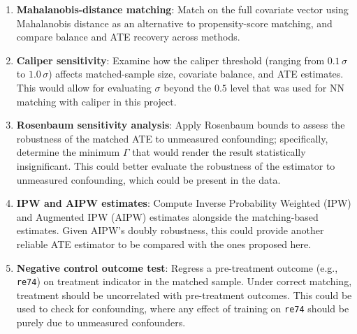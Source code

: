 \documentclass[12pt, a4paper]{article}
\begin{document}
\begin{enumerate}[leftmargin=2em]
  \item \textbf{Mahalanobis-distance matching}: Match on the full covariate vector using Mahalanobis distance as an alternative to propensity-score matching, and compare balance and ATE recovery across methods.
  \item \textbf{Caliper sensitivity}: Examine how the caliper threshold (ranging from $0.1\,\sigma$ to $1.0\,\sigma$) affects matched-sample size, covariate balance, and ATE estimates. This would allow for evaluating $\sigma$ beyond the $0.5$ level that was used for NN matching with caliper in this project.
  \item \textbf{Rosenbaum sensitivity analysis}: Apply Rosenbaum bounds \citep{rosenbaum2002observational} to assess the robustness of the matched ATE to unmeasured confounding; specifically, determine the minimum $\Gamma$ that would render the result statistically insignificant. This could better evaluate the robustness of the estimator to unmeasured confounding, which could be present in the data.
  \item \textbf{IPW and AIPW estimates}: Compute Inverse Probability Weighted (IPW) and Augmented IPW (AIPW) estimates alongside the matching-based estimates. Given AIPW's doubly robustness, this could provide another reliable ATE estimator to be compared with the ones proposed here.
  \item \textbf{Negative control outcome test}: Regress a pre-treatment outcome (e.g., \texttt{re74}) on treatment indicator in the matched sample. Under correct matching, treatment should be uncorrelated with pre-treatment outcomes. This could be used to check for confounding, where any effect of training on \texttt{re74} should be purely due to unmeasured confounders.
\end{enumerate}
\end{document}
